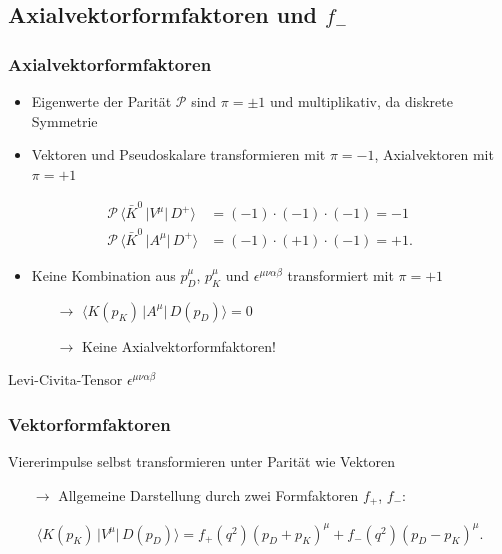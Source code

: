 \documentclass[hyperref={pdfpagelabels=false}]{beamer}
\begin{document}
\subsection{Axialvektorformfaktoren und $f_-$}
\begin{frame}
\frametitle{Axialvektorformfaktoren}
\begin{itemize}
 \item Eigenwerte der Parität $\mathcal{P}$ sind $\pi = \pm1$ und multiplikativ, da diskrete Symmetrie
 \item Vektoren und Pseudoskalare transformieren mit $\pi = -1$, Axialvektoren mit $\pi = +1$
\end{itemize}
\begin{align}
 \mathcal{P} \, \big\langle\bar K^0\,\big|V^\mu|\,D^+\big\rangle &= (-1)\cdot(-1)\cdot(-1) = -1 \nonumber \\
 \mathcal{P} \, \big\langle\bar K^0\,\big|A^\mu|\,D^+\big\rangle &= (-1)\cdot(+1)\cdot(-1) = +1. \nonumber
\end{align}
\begin{itemize}
 \item Keine Kombination aus $p_D^\mu$, $p_K^\mu$ und $\epsilon^{\mu\nu\alpha\beta}$ transformiert mit $\pi = +1$
 \begin{itemize}
  \item [$\rightarrow$] $\big\langle K(p_K)\,\big|A^\mu\big|\, D(p_D)\big\rangle = 0$
  \item [$\rightarrow$] Keine Axialvektorformfaktoren!
 \end{itemize}
\end{itemize}
\vspace{0.5cm}
\small{Levi-Civita-Tensor $\epsilon^{\mu\nu\alpha\beta}$}

\end{frame}

\begin{frame}
 \frametitle{Vektorformfaktoren}
Viererimpulse selbst transformieren unter Parität wie Vektoren
  \begin{itemize}
   \item [$\rightarrow$] Allgemeine Darstellung durch zwei Formfaktoren $f_+$, $f_-$:
  \end{itemize}

\begin{align*}
 \big\langle K(p_K)\,\big|V^\mu\big|\, D(p_D)\big\rangle = f_+(q^2)(p_D+p_K)^\mu + f_-(q^2)(p_D-p_K)^\mu.
\end{align*}
\end{frame}
\end{document}

